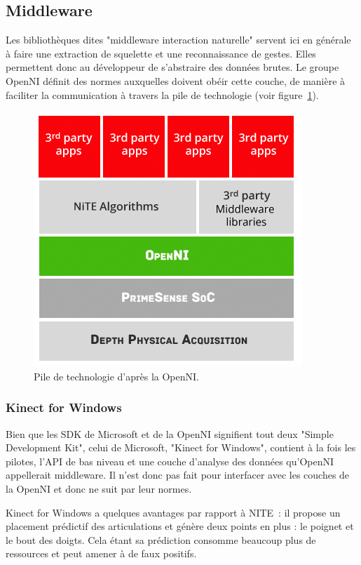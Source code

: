 
\subsection{Middleware}
Les bibliothèques dites "middleware interaction naturelle" servent ici en 
générale à faire une 
extraction de squelette et une reconnaissance de gestes. Elles permettent donc 
au développeur de s'abstraire des données brutes. Le groupe OpenNI définit 
des normes auxquelles doivent obéir cette couche, de 
manière à faciliter la communication à travers la pile de technologie (voir 
figure~\ref{fig:openni_technology_stack}).
\begin{figure}[h!]
\centering
\includegraphics[width=0.7\linewidth]{images/openni_technology_stack}
\caption{Pile de technologie d'après la OpenNI.}
\label{fig:openni_technology_stack}
\end{figure}


\subsubsection{Kinect for Windows}  
Bien que les SDK de Microsoft et de la OpenNI signifient tout deux 
"Simple Development Kit",
celui de Microsoft, "Kinect for Windows", contient à la fois les pilotes, 
l'API de bas niveau et une couche d'analyse des données qu'OpenNI appellerait 
middleware. Il n'est donc pas fait pour interfacer avec les couches de la 
OpenNI et donc ne suit par leur normes.

Kinect for Windows a quelques avantages par rapport à NITE~: il propose un
placement prédictif des articulations et génère deux points en plus :
le poignet et le bout des doigts. Cela étant sa prédiction consomme beaucoup 
plus de ressources et peut amener à de faux positifs.

